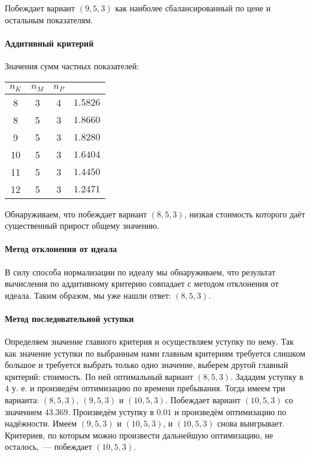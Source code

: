 \documentclass[12pt, a4paper] {ncc}
\begin{document}
Побеждает вариант $(9, 5, 3)$ как наиболее сбалансированный по цене и остальным
показателям.

\paragraph{Аддитивный критерий} Значения сумм частных показателей:

\begin{tabular}{|c|c|c||c|}
\hline
$n_K$ & $n_M$ & $n_P$ &          \\ \hline
\hline
 8    &  3    &  4    & $1.5826$ \\ \hline
 8    &  5    &  3    & $1.8660$ \\ \hline
 9    &  5    &  3    & $1.8280$ \\ \hline
10    &  5    &  3    & $1.6404$ \\ \hline
11    &  5    &  3    & $1.4450$ \\ \hline
12    &  5    &  3    & $1.2471$ \\ \hline
\end{tabular}

Обнаруживаем, что побеждает вариант $(8, 5, 3)$, низкая стоимость которого даёт
существенный прирост общему значению.

\paragraph{Метод отклонения от идеала} В силу способа нормализации по идеалу мы
обнаруживаем, что результат вычисления по аддитивному критерию совпадает с
методом отклонения от идеала. Таким образом, мы уже нашли ответ: $(8, 5, 3)$.

\paragraph{Метод последовательной уступки} Определяем значение главного критерия
и осуществляем уступку по нему. Так как значение уступки по выбранным нами
главным критериям требуется слишком большое и требуется выбрать только одно
значение, выберем другой главный критерий: стоимость. По ней оптимальный вариант
$(8, 5, 3)$. Зададим уступку в $4$ у. е. и произведём оптимизацию по времени
пребывания. Тогда имеем три варианта: $(8, 5, 3)$, $(9, 5, 3)$ и $(10, 5, 3)$.
Побеждает вариант $(10, 5, 3)$ со значением $43.369$. Произведём уступку в
$0.01$ и произведём оптимизацию по надёжности. Имеем $(9, 5, 3)$ и $(10, 5,
3)$, и $(10, 5, 3)$ снова выигрывает. Критериев, по которым можно произвести
дальнейшую оптимизацию, не осталось,~--- побеждает $(10, 5, 3)$.
\end{document}

